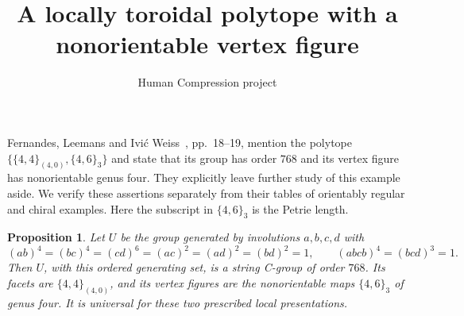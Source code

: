 \documentclass[11pt,a4paper]{article}
\title{A locally toroidal polytope with a nonorientable vertex figure}
\author{Human Compression project}\date{}
\newtheorem{proposition}{Proposition}
\begin{document}
\maketitle
Fernandes, Leemans and Ivi\'c Weiss~\cite{source}, pp.~18--19, mention
the polytope $\{\{4,4\}_{(4,0)},\{4,6\}_3\}$ and state that its
group has order $768$ and its vertex figure has nonorientable genus four.
They explicitly leave further study of this example aside. We verify
these assertions separately from their tables of orientably regular and
chiral examples. Here the subscript in $\{4,6\}_3$ is the Petrie length.

\begin{proposition}
Let $U$ be the group generated by involutions $a,b,c,d$ with
\[
 (ab)^4=(bc)^4=(cd)^6=(ac)^2=(ad)^2=(bd)^2=1,
 \qquad (abcb)^4=(bcd)^3=1.
\]
Then $U$, with this ordered generating set, is a string C-group of order
$768$. Its facets are $\{4,4\}_{(4,0)}$, and its vertex figures are
the nonorientable maps $\{4,6\}_3$ of genus four. It is universal for
these two prescribed local presentations.
\end{proposition}
\end{document}
